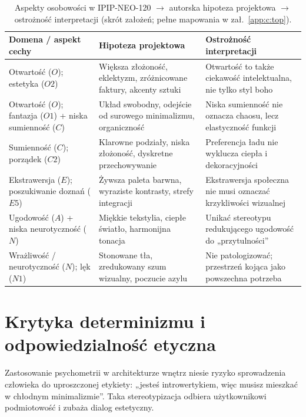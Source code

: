 \begin{table}[htbp]
  \centering
  \caption{Aspekty osobowości w IPIP-NEO-120 $\rightarrow$ autorska hipoteza projektowa $\rightarrow$ ostrożność interpretacji (skrót założeń; pełne mapowania w zał.~\ref{app:c:top}).}
  \label{tab:ch05:hipotezy}
  \begin{tabular}{@{}>{\raggedright\arraybackslash}p{}>{\raggedright\arraybackslash}p{}>{\raggedright\arraybackslash}p{}@{}}
    \toprule
    Domena / aspekt cechy & Hipoteza projektowa & Ostrożność interpretacji \\
    \midrule
    Otwartość ($O$); estetyka ($O2$)
      & Większa złożoność, eklektyzm, zróżnicowane faktury, akcenty sztuki
      & Otwartość to także ciekawość intelektualna, nie tylko styl boho \\
    \addlinespace
    Otwartość ($O$); fantazja ($O1$) + niska sumienność ($C$)
      & Układ swobodny, odejście od surowego minimalizmu, organiczność
      & Niska sumienność nie oznacza chaosu, lecz elastyczność funkcji \\
    \addlinespace
    Sumienność ($C$); porządek ($C2$)
      & Klarowne podziały, niska złożoność, dyskretne przechowywanie
      & Preferencja ładu nie wyklucza ciepła i dekoracyjności \\
    \addlinespace
    Ekstrawersja ($E$); poszukiwanie doznań ($E5$)
      & Żywsza paleta barwna, wyraziste kontrasty, strefy integracji
      & Ekstrawersja społeczna nie musi oznaczać krzykliwości wizualnej \\
    \addlinespace
    Ugodowość ($A$) + niska neurotyczność ($N$)
      & Miękkie tekstylia, ciepłe światło, harmonijna tonacja
      & Unikać stereotypu redukującego ugodowość do „przytulności” \\
    \addlinespace
    Wrażliwość / neurotyczność ($N$); lęk ($N1$)
      & Stonowane tła, zredukowany szum wizualny, poczucie azylu
      & Nie patologizować; przestrzeń kojąca jako powszechna potrzeba \\
    \bottomrule
  \end{tabular}
\end{table}

\section{Krytyka determinizmu i odpowiedzialność etyczna}
\label{ch05:sec:krytyka}

Zastosowanie psychometrii w architekturze wnętrz niesie ryzyko sprowadzenia człowieka do uproszczonej etykiety: „jesteś introwertykiem, więc musisz mieszkać w chłodnym minimalizmie”. Taka stereotypizacja odbiera użytkownikowi podmiotowość i zubaża dialog estetyczny.

